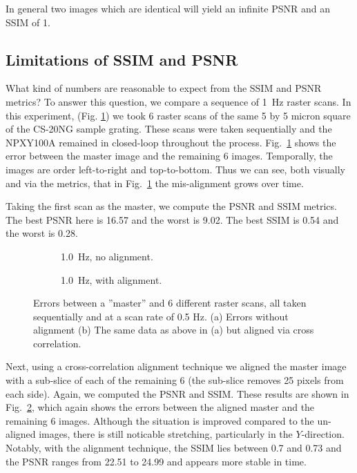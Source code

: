 \documentclass[twocolumn,oneside]{IEEEtran/IEEEtran}
\begin{document}
In general two images which are identical will yield an infinite PSNR and an SSIM of 1.

\subsection{Limitations of SSIM and PSNR}\label{sec:limits}

What kind of numbers are reasonable to expect from the SSIM and PSNR metrics?
To answer this question, we compare a sequence of 1~Hz raster scans.
In this experiment, (Fig. \ref{fig:rast_unaligned_1}) we took 6 raster scans of the same 5 by 5 micron
square of the CS-20NG sample grating. These scans were taken sequentially and
the NPXY100A remained in closed-loop throughout the process.
Fig.~\ref{fig:rast_unaligned_1} shows the error between the master
image and the remaining 6 images.
Temporally, the images are order left-to-right and top-to-bottom.
Thus we can see, both visually and via the metrics, that in Fig.~\ref{fig:rast_unaligned_1} the mis-alignment
grows over time. 

Taking the first scan as the master, we compute the PSNR and SSIM
metrics. The best PSNR here is 16.57 and the worst is 9.02.
The best SSIM is 0.54 and the worst is 0.28.

\begin{figure}[t!]
  \begin{subfigure}{.48\textwidth}
    
    \caption{1.0~Hz, no alignment.}
    \label{fig:rast_unaligned_1}
  \end{subfigure}
  \hfill
  \begin{subfigure}{.48\textwidth}
    
    \caption{1.0~Hz, with alignment.}
    \label{fig:rast_aligned_1}
  \end{subfigure}
% 
  \caption{Errors between a ''master'' and 6 different raster scans, all taken
    sequentially and at a scan rate of 0.5 Hz. (a) Errors without alignment (b)
    The same data as above in (a) but aligned via cross correlation.}
  \label{fig:baseline_errors}
\end{figure}

Next, using a cross-correlation alignment technique
we aligned the master image with a sub-slice of each of
the remaining 6 (the sub-slice removes 25 pixels from each side). Again, we
computed the PSNR and SSIM. These results are shown in
Fig.~\ref{fig:rast_aligned_1}, which again shows the errors between the
aligned master and the remaining 6 images. Although the situation is improved
compared to the un-aligned images, there is still noticable stretching,
particularly in the $Y$-direction. Notably, with the alignment technique,
the SSIM lies between 0.7 and 0.73 and the PSNR ranges from 22.51 to 24.99 and appears more stable in time.
\end{document}
